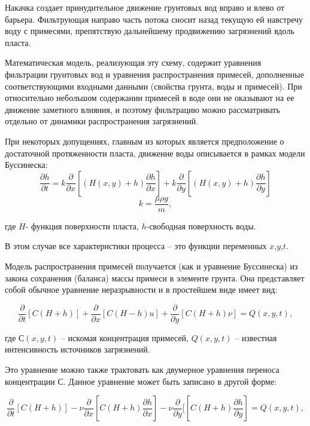 		Накачка создает принудительное движение грунтовых вод вправо и влево от барьера. Фильтрующая направо часть потока сносит назад текущую ей навстречу воду с примесями, препятствую дальнейшему продвижению загрязнений вдоль пласта.
		
		Математическая модель, реализующая эту схему, содержит уравнения фильтрации грунтовых вод 	 и уравнения распространения примесей, дополненные соответствующими входными данными (свойства грунта, воды и примесей).
		При относительно небольшом содержании примесей в воде они не оказывают на ее движение заметного влияния, и поэтому фильтрацию можно рассматривать отдельно  от динамики распространения загрязнений.
		
		При некоторых допущениях, главным из которых является предположение о достаточной протяженности пласта, движение воды описывается в рамках модели Буссинеска\cite{Samarskiy}:
		\begin{equation}
			\frac{\partial h}{\partial t}=k \frac{\partial}{\partial x}[(H(x,y)+h) \frac{\partial h}{\partial x}]+k\frac{\partial}{\partial y}[(H(x,y)+h)  \frac{\partial h}{\partial y}]
		\end{equation} 
		\begin{equation}
			k=\frac{\mu \rho g}{m},
		\end{equation} 
		
		где $ H $- функция поверхности пласта, $ h $-свободная поверхность воды.
		
		В этом случае все характеристики процесса – 		это функции переменных $ x $,$ y $,$ t $.
		
		Модель распространения примесей получается 	   (как и уравнение Буссинеска) из закона сохранения (баланса) массы примеси в элементе грунта. 
		Она представляет собой обычное уравнение неразрывности и в простейшем виде имеет вид:
		
		\begin{equation}
			\frac{\partial }{\partial t}[C(H+h)]+\frac{\partial}{\partial x}[C(H-h)u]+\frac{\partial}{\partial y}[C(H+h)\nu]=Q(x,y,t),
		\end{equation}
		
		где $ С(x,y,t) $ – искомая концентрация примесей, $ Q(x,y,t) $ – известная интенсивность источников загрязнений.
		
		Это уравнение можно также трактовать как двумерное уравнения переноса концентрации $ С $. Данное уравнение может быть записано в другой форме:
		
		\begin{equation}
			\frac{\partial }{\partial t}[C(H+h)]-\nu\frac{\partial}{\partial x}[C(H+h)\frac{\partial h}{\partial x}]-\nu\frac{\partial}{\partial y}[[C(H+h)\frac{\partial h}{\partial y}]=Q(x,y,t),
		\end{equation}
		
